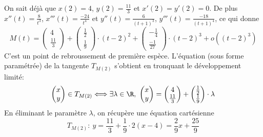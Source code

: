 {\begin{enumerate}
{On sait déjà que $x(2)=4$, $y(2)=\frac{11}{3}$ et $x'(2)=y'(2)=0$. De plus
$x''(t)=\frac{8}{t^3}$, $x'''(t)=\frac{-24}{t^4}$ et $y''(t)=\frac{6}{(t+1)^3}$, $y'''(t)=\frac{-18}{(t+1)^4}$, ce qui donne
$$M(t)=\begin{pmatrix}4 \\ \frac{11}{3}\end{pmatrix}+
\begin{pmatrix}\frac{1}{2}\\\frac{1}{9}\end{pmatrix}\cdot (t-2)^2+
\begin{pmatrix}-\frac{1}{4}\\ \frac{-1}{27}\end{pmatrix}\cdot (t-2)^3+o((t-2)^3)$$
C'est un point de rebroussement de première espèce. L'équation (sous forme paramétrée) de la tangente $T_{M(2)}$ s'obtient en tronquant le développement limité:
$$\begin{pmatrix}x\\ y\end{pmatrix}\in T_{M(2)}
\Longleftrightarrow\exists\lambda\in\R,\ \begin{pmatrix}x \\ y\end{pmatrix}
=\begin{pmatrix}4\\  \frac{11}{3}\end{pmatrix}+
\begin{pmatrix}\frac{1}{2}\\\frac{1}{9}\end{pmatrix}\cdot \lambda$$
En éliminant le paramètre $\lambda$, on récupère une équation cartésienne 
$$T_{M(2)}:\ y=\frac{11}{3}+\frac{1}{9}\cdot 2(x-4)=\frac{2}{9}x+\frac{25}{9}$$}
\end{enumerate}
}